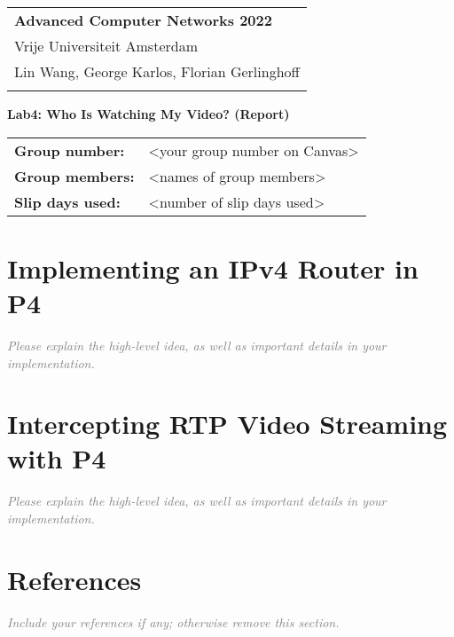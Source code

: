 \documentclass[a4paper,11pt]{article}
\newcommand{\note}[1]{\textit{\textcolor{gray}{#1}}}
\begin{document}
\thispagestyle{empty} 

\begin{tabular}{@{}p{15.5cm}} 
{\bf Advanced Computer Networks 2022} \\
Vrije Universiteit Amsterdam  \\ Lin Wang, George Karlos, Florian Gerlinghoff\\
\hline 
\\
\end{tabular} 

\vspace*{0.3cm} 

{\LARGE \bf Lab4: Who Is Watching My Video? (Report)} 

\vspace*{0.3cm} 


\begin{tcolorbox}[sharp corners, colback=blue!5!white]
\begin{tabular}{@{}ll}
\textbf{Group number:} & <your group number on Canvas> \\
\textbf{Group members:} & <names of group members> \\
\textbf{Slip days used:} & <number of slip days used> \\
\end{tabular}
\end{tcolorbox}

\vspace{0.4cm}


\section{Implementing an IPv4 Router in P4}

\note{Please explain the high-level idea, as well as important details in your implementation.}

\section{Intercepting RTP Video Streaming with P4}

\note{Please explain the high-level idea, as well as important details in your implementation.}

\section{References}

\note{Include your references if any; otherwise remove this section.}
\end{document}

